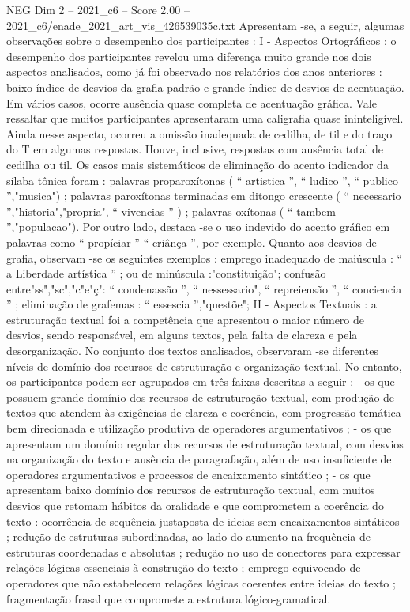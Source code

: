 \begin{textsample}{NEG Dim 2 – 2021\_c6 – Score 2.00 – 2021\_c6/enade\_2021\_art\_vis\_426539035c.txt}
Apresentam -se, a seguir, algumas observações sobre o desempenho dos participantes : I - Aspectos Ortográficos : o desempenho dos participantes revelou uma diferença muito grande nos dois aspectos analisados, como já foi observado nos relatórios dos anos anteriores : baixo índice de desvios da grafia padrão e grande índice de desvios de acentuação.
Em vários casos, ocorre ausência quase completa de acentuação gráfica.
Vale ressaltar que muitos participantes apresentaram uma caligrafia quase ininteligível.
Ainda nesse aspecto, ocorreu a omissão inadequada de cedilha, de til e do traço do T em algumas respostas.
Houve, inclusive, respostas com ausência total de cedilha ou til.
Os casos mais sistemáticos de eliminação do acento indicador da sílaba tônica foram : palavras proparoxítonas ( “ artistica ”, “ ludico ”, “ publico ”,"musica") ; palavras paroxítonas terminadas em ditongo crescente ( “ necessario ”,"historia","propria", “ vivencias ” ) ; palavras oxítonas ( “ tambem ”,"populacao").
Por outro lado, destaca -se o uso indevido do acento gráfico em palavras como “ propíciar ” “ criânça ”, por exemplo.
Quanto aos desvios de grafia, observam -se os seguintes exemplos : emprego inadequado de maiúscula : “ a Liberdade artística ” ; ou de minúscula :"constituição"; confusão entre"ss","sc","c"e"ç": “ condenassão ”, “ nessessario", “ repreiensão ”, “ conciencia ” ; eliminação de grafemas : “ essescia ”,"questõe"; II - Aspectos Textuais : a estruturação textual foi a competência que apresentou o maior número de desvios, sendo responsável, em alguns textos, pela falta de clareza e pela desorganização.
No conjunto dos textos analisados, observaram -se diferentes níveis de domínio dos recursos de estruturação e organização textual.
No entanto, os participantes podem ser agrupados em três faixas descritas a seguir : - os que possuem grande domínio dos recursos de estruturação textual, com produção de textos que atendem às exigências de clareza e coerência, com progressão temática bem direcionada e utilização produtiva de operadores argumentativos ; - os que apresentam um domínio regular dos recursos de estruturação textual, com desvios na organização do texto e ausência de paragrafação, além de uso insuficiente de operadores argumentativos e processos de encaixamento sintático ; - os que apresentam baixo domínio dos recursos de estruturação textual, com muitos desvios que retomam hábitos da oralidade e que comprometem a coerência do texto : ocorrência de sequência justaposta de ideias sem encaixamentos sintáticos ; redução de estruturas subordinadas, ao lado do aumento na frequência de estruturas coordenadas e absolutas ; redução no uso de conectores para expressar relações lógicas essenciais à construção do texto ; emprego equivocado de operadores que não estabelecem relações lógicas coerentes entre ideias do texto ; fragmentação frasal que compromete a estrutura lógico-gramatical.

\end{textsample}
